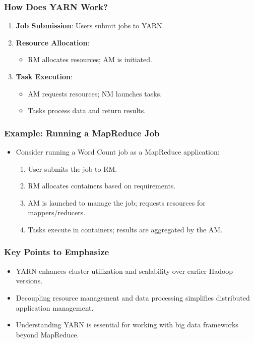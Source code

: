 \documentclass[aspectratio=169]{beamer}
\begin{document}
\begin{frame}[fragile]
    \frametitle{How Does YARN Work?}
    \begin{enumerate}
        \item \textbf{Job Submission}: Users submit jobs to YARN.
        \item \textbf{Resource Allocation}:
            \begin{itemize}
                \item RM allocates resources; AM is initiated.
            \end{itemize}
        \item \textbf{Task Execution}:
            \begin{itemize}
                \item AM requests resources; NM launches tasks.
                \item Tasks process data and return results.
            \end{itemize}
    \end{enumerate}
\end{frame}

\begin{frame}[fragile]
    \frametitle{Example: Running a MapReduce Job}
    \begin{itemize}
        \item Consider running a Word Count job as a MapReduce application:
        \begin{enumerate}
            \item User submits the job to RM.
            \item RM allocates containers based on requirements.
            \item AM is launched to manage the job; requests resources for mappers/reducers.
            \item Tasks execute in containers; results are aggregated by the AM.
        \end{enumerate}
    \end{itemize}
\end{frame}

\begin{frame}[fragile]
    \frametitle{Key Points to Emphasize}
    \begin{itemize}
        \item YARN enhances cluster utilization and scalability over earlier Hadoop versions.
        \item Decoupling resource management and data processing simplifies distributed application management.
        \item Understanding YARN is essential for working with big data frameworks beyond MapReduce.
    \end{itemize}
\end{frame}
\end{document}
